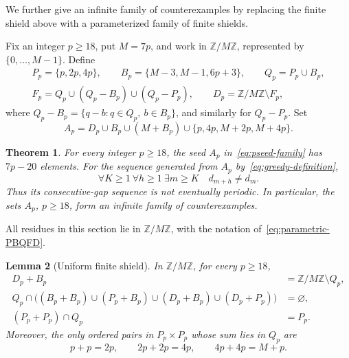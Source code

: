 \documentclass[11pt,letterpaper]{article}
\newtheorem{theorem}{Theorem}[section]
\newtheorem{lemma}[theorem]{Lemma}
\newcommand{\ZM}{\mathbb{Z}/M\mathbb{Z}}
\begin{document}
We further give an infinite family of counterexamples by replacing the finite shield above with a parameterized family of finite shields.

Fix an integer \(p\geq18\), put \(M=7p\), and work in \(\ZM\), represented by \(\{0,\ldots,M-1\}\). Define
\begin{equation}\label{eq:parametric-PBQFD}
\begin{gathered}
P_p=\{p,2p,4p\},
\qquad
B_p=\{M-3,M-1,6p+3\},
\qquad Q_p=P_p\cup B_p,\\
F_p=Q_p\cup(Q_p-B_p)\cup(Q_p-P_p),
\qquad
D_p=\ZM\setminus F_p,
\end{gathered}
\end{equation}
where \(Q_p-B_p=\{q-b:q\in Q_p,\ b\in B_p\}\), and similarly for \(Q_p-P_p\). Set
\begin{equation}\label{eq:pseed-family}
A_p=D_p\cup B_p\cup(M+B_p)\cup\{p,4p,M+2p,M+4p\}.
\end{equation}

\begin{theorem}\label{thm:pmain}
For every integer \(p\geq18\), the seed \(A_p\) in~\eqref{eq:pseed-family} has \(7p-20\) elements. For the sequence generated from \(A_p\) by~\eqref{eq:greedy-definition},
\[
\forall K\geq1\ \forall h\geq1\ \exists m\geq K
\quad d_{m+h}\neq d_m.
\]
Thus its consecutive-gap sequence is not eventually periodic. In particular, the sets \(A_p\), \(p\geq18\), form an infinite family of counterexamples.
\end{theorem}

All residues in this section lie in \(\ZM\), with the notation of~\eqref{eq:parametric-PBQFD}.

\begin{lemma}[Uniform finite shield]\label{lem:pshield}
In $\ZM$, for every \(p\geq18\),
\begin{align}
D_p+B_p&=\ZM\setminus Q_p,                                      \label{eq:pcover-mod}\\
Q_p\cap\bigl((B_p+B_p)\cup(P_p+B_p)\cup(D_p+B_p)\cup(D_p+P_p)\bigr)
&=\varnothing,                                             \label{eq:pavoid-mod}\\
(P_p+P_p)\cap Q_p&=P_p.                                            \label{eq:pPP-mod}
\end{align}
Moreover, the only ordered pairs in \(P_p\times P_p\) whose sum lies in \(Q_p\) are
\begin{equation}\label{eq:pdiagonal-pairs}
p+p=2p,
\qquad
2p+2p=4p,
\qquad
4p+4p=M+p.
\end{equation}
\end{lemma}
\end{document}
